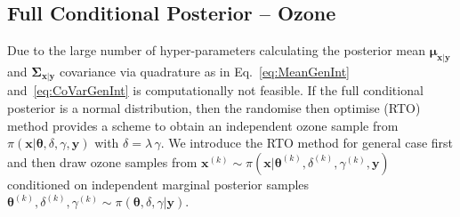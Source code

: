 \subsection{Full Conditional Posterior -- Ozone}
Due to the large number of hyper-parameters calculating the posterior mean $\bm{\mu}_{\bm{x}|\bm{y}}$ and $\bm{\Sigma}_{\bm{x}|\bm{y}}$ covariance via quadrature as in Eq.~\ref{eq:MeanGenInt} and~\ref{eq:CoVarGenInt} is computationally not feasible.
If the full conditional posterior is a normal distribution, then the randomise then optimise (RTO) method provides a scheme to obtain an independent ozone sample from $\pi(\bm{x}|\bm{\theta}, \delta, \gamma, \bm{y})$ with $\delta = \lambda \, \gamma$.
We introduce the RTO method for general case first and then draw ozone samples from $\bm{x}^{(k)} \sim \pi(\bm{x}|\bm{\theta}^{(k)} , \delta^{(k)} , \gamma^{(k)} , \bm{y})$ conditioned on independent marginal posterior samples $\bm{\theta}^{(k)} , \delta^{(k)} , \gamma^{(k)} \sim \pi(\bm{\theta} , \delta , \gamma | \bm{y})$.


